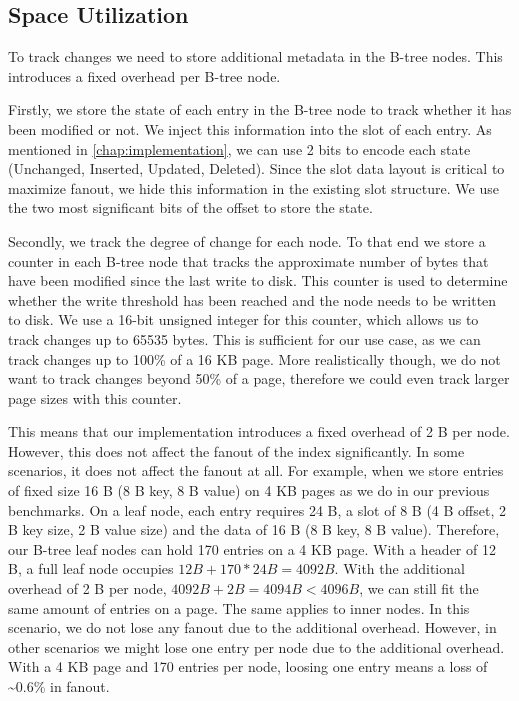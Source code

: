 \subsection{Space Utilization}
\label{sec:space_overhead}
To track changes we need to store additional metadata in the B-tree nodes.
This introduces a fixed overhead per B-tree node.

Firstly, we store the state of each entry in the B-tree node to track whether it has been modified or not.
We inject this information into the slot of each entry.
As mentioned in \autoref{chap:implementation}, we can use 2 bits to encode each state (Unchanged, Inserted, Updated, Deleted).
Since the slot data layout is critical to maximize fanout, we hide this information in the existing slot structure.
We use the two most significant bits of the offset to store the state.

Secondly, we track the degree of change for each node.
To that end we store a counter in each B-tree node that tracks the approximate number of bytes that have been modified since the last write to disk.
This counter is used to determine whether the write threshold has been reached and the node needs to be written to disk.
We use a 16-bit unsigned integer for this counter, which allows us to track changes up to 65535 bytes.
This is sufficient for our use case, as we can track changes up to 100\% of a 16 KB page.
More realistically though, we do not want to track changes beyond 50\% of a page, therefore we could even track larger page sizes with this counter.

This means that our implementation introduces a fixed overhead of 2 B per node.
However, this does not affect the fanout of the index significantly.
In some scenarios, it does not affect the fanout at all.
For example, when we store entries of fixed size 16 B (8 B key, 8 B value) on 4 KB pages as we do in our previous benchmarks.
On a leaf node, each entry requires 24 B, a slot of 8 B (4 B offset, 2 B key size, 2 B value size) and the data of 16 B (8 B key, 8 B value).
Therefore, our B-tree leaf nodes can hold 170 entries on a 4 KB page.
With a header of 12 B, a full leaf node occupies $12 B + 170 * 24 B = 4092 B$.
With the additional overhead of 2 B per node, $ 4092 B + 2 B = 4094 B < 4096 B$, we can still fit the same amount of entries on a page.
The same applies to inner nodes.
In this scenario, we do not lose any fanout due to the additional overhead.
However, in other scenarios we might lose one entry per node due to the additional overhead.
With a 4 KB page and 170 entries per node, loosing one entry means a loss of \textasciitilde0.6\% in fanout.

